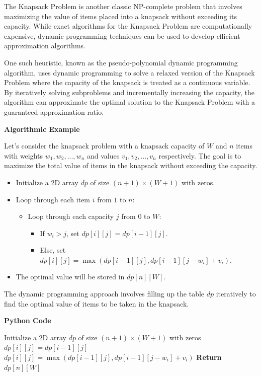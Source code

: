 \documentclass[12pt]{book} %
\begin{document}
The Knapsack Problem is another classic NP-complete problem that involves maximizing the value of items placed into a knapsack without exceeding its capacity. While exact algorithms for the Knapsack Problem are computationally expensive, dynamic programming techniques can be used to develop efficient approximation algorithms.

One such heuristic, known as the pseudo-polynomial dynamic programming algorithm, uses dynamic programming to solve a relaxed version of the Knapsack Problem where the capacity of the knapsack is treated as a continuous variable. By iteratively solving subproblems and incrementally increasing the capacity, the algorithm can approximate the optimal solution to the Knapsack Problem with a guaranteed approximation ratio.

\textbf{Algorithmic Example}

Let's consider the knapsack problem with a knapsack capacity of $W$ and $n$ items with weights $w_1, w_2, ..., w_n$ and values $v_1, v_2, ..., v_n$ respectively. The goal is to maximize the total value of items in the knapsack without exceeding the capacity.
 
\begin{itemize}
    \item Initialize a 2D array $dp$ of size $(n+1) \times (W+1)$ with zeros.
    \item Loop through each item $i$ from $1$ to $n$:
    \begin{itemize}
        \item Loop through each capacity $j$ from $0$ to $W$:
        \begin{itemize}
            \item If $w_i > j$, set $dp[i][j] = dp[i-1][j]$.
            \item Else, set $dp[i][j] = \max(dp[i-1][j], dp[i-1][j-w_i] + v_i)$.
        \end{itemize}
    \end{itemize}
     \item The optimal value will be stored in $dp[n][W]$.
\end{itemize}


The dynamic programming approach involves filling up the table $dp$ iteratively to find the optimal value of items to be taken in the knapsack.

\textbf{Python Code}
\FloatBarrier
\begin{algorithm}
\caption{Dynamic Programming for Knapsack Problem}
\begin{algorithmic}[1]
\State Initialize a 2D array $dp$ of size $(n+1) \times (W+1)$ with zeros
            \State $dp[i][j] = dp[i-1][j]$
        \Else
            \State $dp[i][j] = \max(dp[i-1][j], dp[i-1][j-w_i] + v_i)$
        \EndIf
    \EndFor
\EndFor
\State \textbf{Return} $dp[n][W]$
\end{algorithmic}
\end{algorithm}
\FloatBarrier
\end{document}
